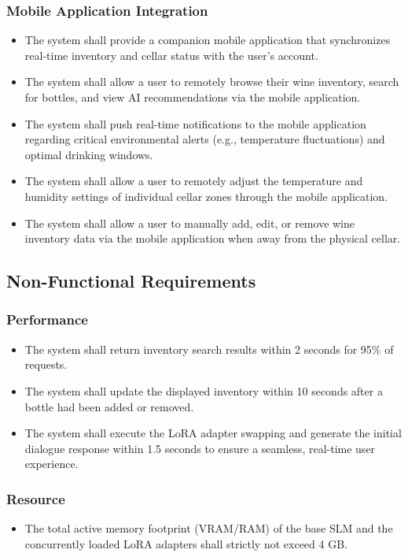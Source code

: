 \documentclass[conference]{IEEEtran}
\begin{document}
\subsubsection{Mobile Application Integration}
\begin{itemize}
    \item The system shall provide a companion mobile application that synchronizes real-time inventory and cellar status with the user's account.
    \item The system shall allow a user to remotely browse their wine inventory, search for bottles, and view AI recommendations via the mobile application.
    \item The system shall push real-time notifications to the mobile application regarding critical environmental alerts (e.g., temperature fluctuations) and optimal drinking windows.
    \item The system shall allow a user to remotely adjust the temperature and humidity settings of individual cellar zones through the mobile application.
    \item The system shall allow a user to manually add, edit, or remove wine inventory data via the mobile application when away from the physical cellar.
\end{itemize}

\subsection{Non-Functional Requirements}

\subsubsection{Performance}
\begin{itemize}
    \item The system shall return inventory search results within 2 seconds for 95\% of requests.
    \item The system shall update the displayed inventory within 10 seconds after a bottle had been added or removed.
    \item The system shall execute the LoRA adapter swapping and generate the initial dialogue response within 1.5 seconds to ensure a seamless, real-time user experience.
\end{itemize}

\subsubsection{Resource}
\begin{itemize}
    \item The total active memory footprint (VRAM/RAM) of the base SLM and the concurrently loaded LoRA adapters shall strictly not exceed 4 GB.
\end{itemize}
\end{document}
